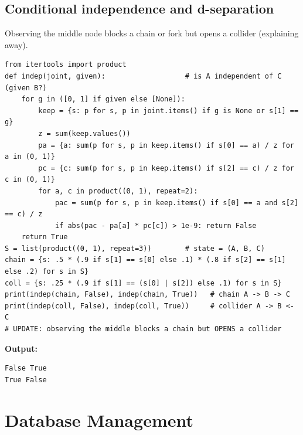 \documentclass[11pt]{article}
\begin{document}
\subsection*{Conditional independence and d-separation}
Observing the middle node blocks a chain or fork but opens a collider (explaining away).
\begin{Verbatim}[fontsize=\footnotesize,frame=single]
from itertools import product
def indep(joint, given):                   # is A independent of C (given B?)
    for g in ([0, 1] if given else [None]):
        keep = {s: p for s, p in joint.items() if g is None or s[1] == g}
        z = sum(keep.values())
        pa = {a: sum(p for s, p in keep.items() if s[0] == a) / z for a in (0, 1)}
        pc = {c: sum(p for s, p in keep.items() if s[2] == c) / z for c in (0, 1)}
        for a, c in product((0, 1), repeat=2):
            pac = sum(p for s, p in keep.items() if s[0] == a and s[2] == c) / z
            if abs(pac - pa[a] * pc[c]) > 1e-9: return False
    return True
S = list(product((0, 1), repeat=3))        # state = (A, B, C)
chain = {s: .5 * (.9 if s[1] == s[0] else .1) * (.8 if s[2] == s[1] else .2) for s in S}
coll = {s: .25 * (.9 if s[1] == (s[0] | s[2]) else .1) for s in S}
print(indep(chain, False), indep(chain, True))   # chain A -> B -> C
print(indep(coll, False), indep(coll, True))     # collider A -> B <- C
# UPDATE: observing the middle blocks a chain but OPENS a collider
\end{Verbatim}
\textbf{Output:}
\begin{Verbatim}[fontsize=\footnotesize,frame=single]
False True
True False
\end{Verbatim}
\section{Database Management}
\end{document}
